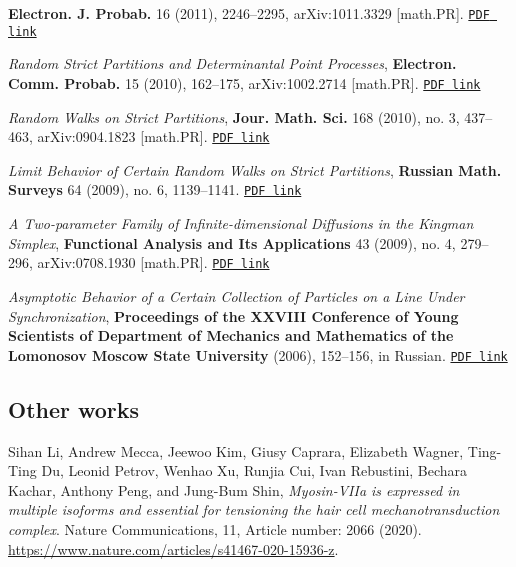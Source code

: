 \documentclass[letterpaper,11pt]{article}
\begin{document}
\begin{etaremune}
			\textbf{Electron. J. Probab.} 16 (2011), 2246--2295,
	      arXiv:1011.3329 [math.PR].
		\href{https://storage.lpetrov.cc/research_files/Petrov-publ/06-publ-petrov.pdf}{\texttt{PDF link}}
	\item
	      \emph{Random Strict Partitions and Determinantal Point
		      Processes},
					\textbf{Electron. Comm. Probab.} 15 (2010), 162--175,
	      arXiv:1002.2714 [math.PR].
		\href{https://storage.lpetrov.cc/research_files/Petrov-publ/05-publ-petrov.pdf}{\texttt{PDF link}}
	\item
	      \emph{Random Walks on Strict Partitions}, 
				\textbf{Jour. Math. Sci.}
				168 (2010), no. 3, 437--463,
	      arXiv:0904.1823 [math.PR].
		\href{https://storage.lpetrov.cc/research_files/Petrov-publ/04-publ-petrov.pdf}{\texttt{PDF link}}
	\item
	      \emph{Limit Behavior of Certain Random Walks on Strict
		      Partitions},
					\textbf{Russian Math. Surveys} 64 (2009), no. 6, 1139--1141.
		\href{https://storage.lpetrov.cc/research_files/Petrov-publ/03-publ-petrov.pdf}{\texttt{PDF link}}
	\item
	      \emph{A Two-parameter Family of Infinite-dimensional Diffusions
		      in the Kingman Simplex}, \textbf{Functional Analysis and Its
					Applications} 43 (2009), no. 4, 279--296, arXiv:0708.1930
	      [math.PR].
		\href{https://storage.lpetrov.cc/research_files/Petrov-publ/02-publ-petrov.pdf}{\texttt{PDF link}}
	\item
	      \emph{Asymptotic Behavior of a Certain Collection of Particles
		      on a Line Under Synchronization}, \textbf{Proceedings of the XXVIII
	      Conference of Young Scientists of Department of Mechanics and
			Mathematics of the Lomonosov Moscow State University} (2006), 152--156, in
	      Russian.
		\href{https://storage.lpetrov.cc/research_files/Petrov-publ/01-publ-petrov-russian.pdf}{\texttt{PDF link}}
\end{etaremune}

\subsection*{Other works}

\begin{etaremune}
	\renewcommand{\labelenumi}{[\theenumi]}
	\item
	Sihan Li, Andrew Mecca, Jeewoo Kim, Giusy Caprara, Elizabeth Wagner, Ting-Ting Du, Leonid Petrov, Wenhao Xu, Runjia Cui, Ivan Rebustini, Bechara Kachar, Anthony Peng, and Jung-Bum Shin,
	\emph{Myosin-VIIa is expressed in multiple isoforms and essential for tensioning the hair cell mechanotransduction complex}.
	Nature Communications, 11, Article number: 2066 (2020). \url{https://www.nature.com/articles/s41467-020-15936-z}.
\end{etaremune}
\end{document}
